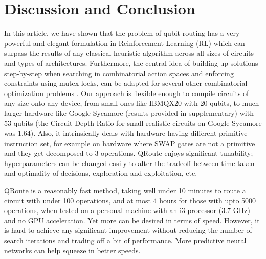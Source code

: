 \section{\label{sec:discussion-conclusion}Discussion and Conclusion}

In this article, we have shown that the problem of qubit routing has a very powerful and elegant formulation in Reinforcement Learning (RL) which can surpass the results of any classical heuristic algorithm across all sizes of circuits and types of architectures. Furthermore, the central idea of building up solutions step-by-step when searching in combinatorial action spaces and enforcing constraints using mutex locks, can be adapted for several other combinatorial optimization problems \cite{comb_survey, comb_1, comb_2, comb_3, comb_4}. Our approach is flexible enough to compile circuits of any size onto any device, from small ones like IBMQX20 with 20 qubits, to much larger hardware like Google Sycamore (results provided in supplementary) with 53 qubits (the Circuit Depth Ratio for small realistic circuits on Google Sycamore was 1.64). Also, it intrinsically deals with hardware having different primitive instruction set, for example on hardware where SWAP gates are not a primitive and they get decomposed to 3 operations. QRoute enjoys significant tunability; hyperparameters can be changed easily to alter the tradeoff between time taken and optimality of decisions, exploration and exploitation, etc.

QRoute is a reasonably fast method, taking well under 10 minutes to route a circuit with under 100 operations, and at most 4 hours for those with upto 5000 operations, when tested on a personal machine with an i3 processor (3.7 GHz) and no GPU acceleration. Yet more can be desired in terms of speed. However, it is hard to achieve any significant improvement without reducing the number of search iterations and trading off a bit of performance. More predictive neural networks can help squeeze in better speeds.

